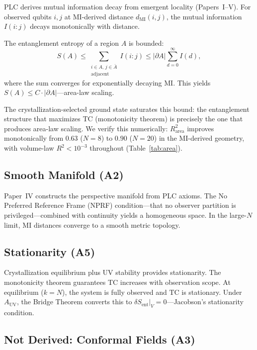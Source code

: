 \documentclass[aps,pra,twocolumn,superscriptaddress,floatfix]{revtex4-2}
\begin{document}
PLC derives mutual information decay from emergent locality (Papers~I--V).
For observed qubits $i, j$ at MI-derived distance $d_{\mathrm{MI}}(i,j)$, the mutual information $I(i\!:\!j)$ decays monotonically with distance.

The entanglement entropy of a region $A$ is bounded:
\begin{equation}
S(A) \leq \sum_{\substack{i \in A, \, j \in \bar{A} \\ \mathrm{adjacent}}} I(i\!:\!j) \leq |\partial A| \sum_{d=0}^{\infty} I(d),
\label{eq:area_bound}
\end{equation}
where the sum converges for exponentially decaying MI.
This yields $S(A) \leq C \cdot |\partial A|$---area-law scaling.

The crystallization-selected ground state saturates this bound:
the entanglement structure that maximizes TC (monotonicity theorem) is precisely the one that produces area-law scaling.
We verify this numerically: $R^2_{\mathrm{area}}$ improves monotonically from $0.63$ ($N\!=\!8$) to $0.90$ ($N\!=\!20$) in the MI-derived geometry, with volume-law $R^2 < 10^{-3}$ throughout (Table~\ref{tab:area}).

\subsection{Smooth Manifold (A2)}

Paper~IV constructs the perspective manifold from PLC axioms.
The No Preferred Reference Frame (NPRF) condition---that no observer partition is privileged---combined with continuity yields a homogeneous space.
In the large-$N$ limit, MI distances converge to a smooth metric topology.

\subsection{Stationarity (A5)}

Crystallization equilibrium plus UV stability provides stationarity.
The monotonicity theorem guarantees TC increases with observation scope.
At equilibrium ($k = N$), the system is fully observed and $\mathrm{TC}$ is stationary.
Under $A_{\mathrm{UV}}$, the Bridge Theorem converts this to $\delta S_{\mathrm{ent}}|_V = 0$---Jacobson's stationarity condition.

\subsection{Not Derived: Conformal Fields (A3)}
\end{document}
